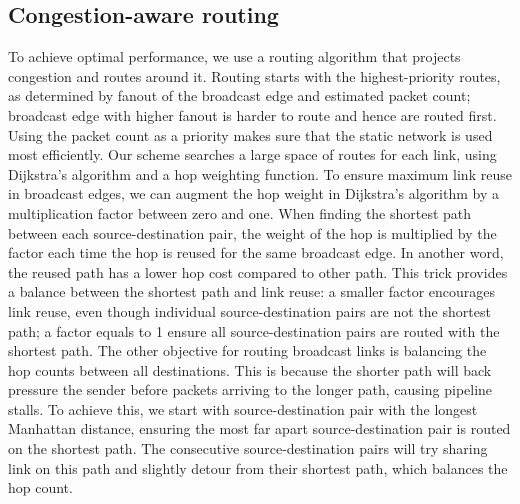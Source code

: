 \subsection{Congestion-aware routing} \label{sec:route}
To achieve optimal performance, we use a routing algorithm that projects congestion and routes around it. 
Routing starts with the highest-priority routes, as determined by fanout of the broadcast edge and
estimated packet count; broadcast edge with higher fanout is harder to route and hence are routed
first.
Using the packet count as a priority makes sure that the static network is used most efficiently.
Our scheme searches a large space of routes for each link, using Dijkstra's algorithm \cite{dijkstra} and a hop weighting function.
To ensure maximum link reuse in broadcast edges, we can augment the hop weight in Dijkstra's
algorithm by a multiplication factor between zero and one. 
When finding the shortest path between each source-destination pair, the weight of the hop is
multiplied by the factor each time the hop is reused for the same broadcast edge.
In another word, the reused path has a lower hop cost compared to other path.
This trick provides a balance between the shortest path and link reuse: a smaller factor encourages link
reuse, even though individual source-destination pairs are not the shortest path; a factor equals to
1 ensure all source-destination pairs are routed with the shortest path.
The other objective for routing broadcast links is balancing the hop counts between all
destinations. This is because the shorter path will back pressure the sender before packets arriving
to the longer path, causing pipeline stalls.
To achieve this, we start with source-destination pair with the longest Manhattan distance, ensuring
the most far apart source-destination pair is routed on the shortest path.
The consecutive source-destination pairs will try sharing link on this path and slightly detour from
their shortest path, which balances the hop count.

